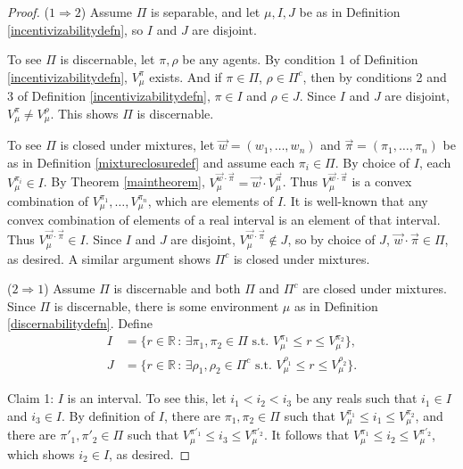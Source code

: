 \documentclass[twoside]{article}
\begin{document}
\begin{proof}
    ($1\Rightarrow 2$)
    Assume $\Pi$ is separable, and let $\mu,I,J$ be as in
    Definition \ref{incentivizabilitydefn}, so $I$ and $J$ are disjoint.

    To see $\Pi$ is discernable, let $\pi,\rho$ be any agents.
    By condition 1 of Definition \ref{incentivizabilitydefn},
    $V^\pi_\mu$ exists. And if $\pi\in\Pi$, $\rho\in\Pi^c$, then
    by conditions 2 and 3 of Definition \ref{incentivizabilitydefn},
    $\pi\in I$ and $\rho\in J$. Since $I$ and $J$ are disjoint,
    $V^\pi_\mu\not=V^\rho_\mu$. This shows $\Pi$ is discernable.

    To see $\Pi$ is closed under mixtures, let $\vec w=(w_1,\ldots,w_n)$
    and $\vec\pi=(\pi_1,\ldots,\pi_n)$ be as in Definition \ref{mixtureclosuredef}
    and assume each $\pi_i\in\Pi$.
    By choice of $I$, each $V^{\pi_i}_\mu\in I$.
    By Theorem \ref{maintheorem},
    $V^{\vec w\cdot\vec\pi}_\mu=\vec w\cdot V^{\vec\pi}_\mu$.
    Thus $V^{\vec w\cdot\vec\pi}_\mu$ is a convex combination
    of $V^{\pi_1}_\mu,\ldots,V^{\pi_n}_\mu$, which are elements of $I$.
    It is well-known that any convex combination of elements of a real interval
    is an element of that interval. Thus $V^{\vec w\cdot\vec\pi}_\mu\in I$.
    Since $I$ and $J$ are disjoint, $V^{\vec w\cdot\vec\pi}_\mu\not\in J$,
    so by choice of $J$, $\vec w\cdot\vec\pi\in\Pi$, as desired.
    A similar argument shows $\Pi^c$ is closed under mixtures.

    ($2\Rightarrow 1$)
    Assume $\Pi$ is discernable and both $\Pi$ and $\Pi^c$ are closed under mixtures.
    Since $\Pi$ is discernable, there is some environment $\mu$
    as in Definition \ref{discernabilitydefn}.
    Define
    \begin{align*}
        I &= \{
            r\in\mathbb R
            \,:\,
            \exists \pi_1,\pi_2\in\Pi\mbox{ s.t. }V^{\pi_1}_\mu\leq r\leq V^{\pi_2}_\mu
        \},\\
        J &= \{
            r\in\mathbb R
            \,:\,
            \exists \rho_1,\rho_2\in\Pi^c\mbox{ s.t. }V^{\rho_1}_\mu\leq r\leq V^{\rho_2}_\mu
        \}.
    \end{align*}

    Claim 1: $I$ is an interval. To see this, let $i_1<i_2<i_3$ be any reals
    such that $i_1\in I$ and $i_3\in I$.
    By definition of $I$, there are $\pi_1,\pi_2\in\Pi$
    such that $V^{\pi_1}_\mu\leq i_1\leq V^{\pi_2}_\mu$,
    and there are $\pi'_1,\pi'_2\in\Pi$ such that
    $V^{\pi'_1}_\mu\leq i_3\leq V^{\pi'_2}_\mu$.
    It follows that $V^{\pi_1}_\mu\leq i_2\leq V^{\pi'_2}_\mu$,
    which shows $i_2\in I$, as desired.


\end{proof}
\end{document}
